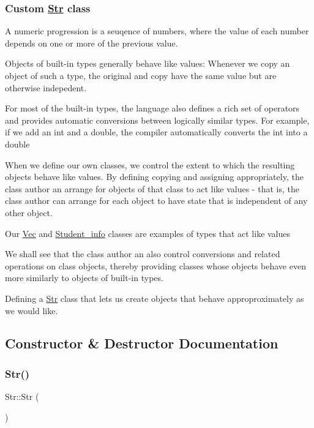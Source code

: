 \subsubsection*{Custom \hyperlink{classStr}{Str} class }

A numeric progression is a seuqence of numbers, where the value of each number depends on one or more of the previous value.

Objects of built-\/in types generally behave like values\+: Whenever we copy an object of such a type, the original and copy have the same value but are otherwise indepedent.

For most of the built-\/in types, the language also defines a rich set of operators and provides automatic conversions between logically similar types. For example, if we add an int and a double, the compiler automatically converts the int into a double

When we define our own classes, we control the extent to which the resulting objects behave like values. By defining copying and assigning appropriately, the class author an arrange for objects of that class to act like values -\/ that is, the class author can arrange for each object to have state that is independent of any other object.

Our \hyperlink{classVec}{Vec} and \hyperlink{classStudent__info}{Student\+\_\+info} classes are examples of types that act like values

We shall see that the class author an also control conversions and related operations on class objects, thereby providing classes whose objects behave even more similarly to objects of built-\/in types.

Defining a \hyperlink{classStr}{Str} class that lets us create objects that behave approproximately as we would like. 

\subsection{Constructor \& Destructor Documentation}
\mbox{\label{classStr_a51d07a34edbcb6ab60c23c0a1f6d2625}} 
\subsubsection{\texorpdfstring{Str()}{Str()}\hspace{0.1cm}{\footnotesize\ttfamily [1/2]}}
{\footnotesize\ttfamily Str\+::\+Str (\begin{DoxyParamCaption}{ }\end{DoxyParamCaption})\hspace{0.3cm}{\ttfamily [inline]}}

